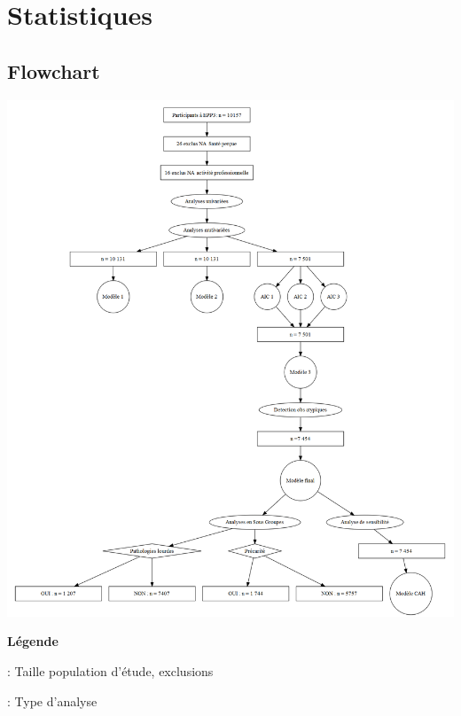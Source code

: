 \documentclass{book}
\begin{document}
\newpage
\section{Statistiques}
\subsection{Flowchart}

\begin{center}
\includegraphics[scale=.45]{flowchart.png}
\end{center}

\noindent
\textbf{Légende}\\

\bigskip
\noindent
{} : Taille population d'étude, exclusions\\

\noindent
{} : Type d'analyse\\
\end{document}
